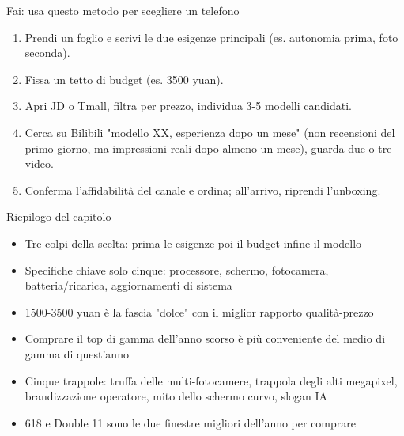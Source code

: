 \begin{tcbpractice}{Fai: usa questo metodo per scegliere un telefono}
\begin{enumerate}
  \item Prendi un foglio e scrivi le due esigenze principali (es. autonomia prima, foto seconda).
  \item Fissa un tetto di budget (es. 3500 yuan).
  \item Apri JD o Tmall, filtra per prezzo, individua 3-5 modelli candidati.
  \item Cerca su Bilibili "modello XX, esperienza dopo un mese" (non recensioni del primo giorno, ma impressioni reali dopo almeno un mese), guarda due o tre video.
  \item Conferma l'affidabilità del canale e ordina; all'arrivo, riprendi l'unboxing.
\end{enumerate}

\end{tcbpractice}

\begin{tcbsummary}{Riepilogo del capitolo}
\begin{itemize}
  \item Tre colpi della scelta: prima le esigenze poi il budget infine il modello
  \item Specifiche chiave solo cinque: processore, schermo, fotocamera, batteria/ricarica, aggiornamenti di sistema
  \item 1500-3500 yuan è la fascia "dolce" con il miglior rapporto qualità-prezzo
  \item Comprare il top di gamma dell'anno scorso è più conveniente del medio di gamma di quest'anno
  \item Cinque trappole: truffa delle multi-fotocamere, trappola degli alti megapixel, brandizzazione operatore, mito dello schermo curvo, slogan IA
  \item 618 e Double 11 sono le due finestre migliori dell'anno per comprare
\end{itemize}

\end{tcbsummary}
